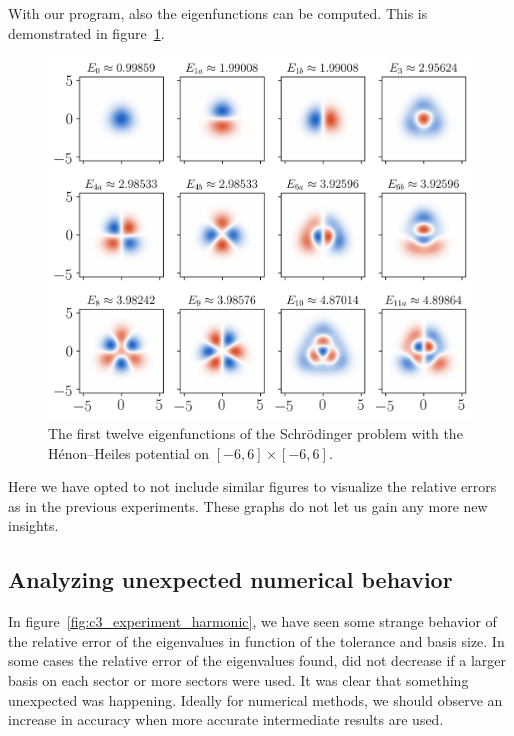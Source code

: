 With our program, also the eigenfunctions can be computed. This is demonstrated in figure~\ref{fig:henon_heiles_eigenfunction}.
\begin{figure}
  \begin{center}
    \includegraphics[width=\linewidth]{img/chapter3/experiments/henon_heiles_eigenfunctions.png}
    \caption{\label{fig:henon_heiles_eigenfunction} The first twelve eigenfunctions of the Schrödinger problem with the Hénon--Heiles potential on $[-6, 6]\times[-6,6]$.}
  \end{center}
\end{figure}

Here we have opted to not include similar figures to visualize the relative errors as in the previous experiments. These graphs do not let us gain any more new insights.

\subsection{Analyzing unexpected numerical behavior}\label{sec:c3_conclusion_hypothesis}

In figure~\ref{fig:c3_experiment_harmonic}, we have seen some strange behavior of the relative error of the eigenvalues in function of the tolerance and basis size. In some cases the relative error of the eigenvalues found, did not decrease if a larger basis on each sector or more sectors were used. It was clear that something unexpected was happening. Ideally for numerical methods, we should observe an increase in accuracy when more accurate intermediate results are used.

